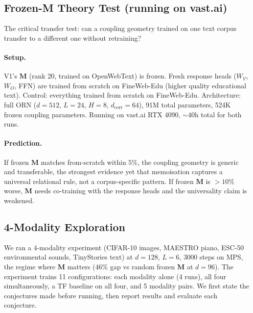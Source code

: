 \documentclass[11pt, a4paper]{article}
\newcommand{\M}{\mathbf{M}}
\theoremstyle{plain}
\theoremstyle{remark}
\begin{document}
\subsection{Frozen-M Theory Test (running on vast.ai)}

The critical transfer test: can a coupling geometry trained on one text corpus transfer to a different one without retraining?

\paragraph{Setup.}
V1's $\M$ (rank 20, trained on OpenWebText) is frozen.
Fresh response heads ($W_V$, $W_O$, FFN) are trained from scratch on FineWeb-Edu (higher quality educational text).
Control: everything trained from scratch on FineWeb-Edu.
Architecture: full ORN ($d{=}512$, $L{=}24$, $H{=}8$, $d_{\text{corr}}{=}64$), 91M total parameters, 524K frozen coupling parameters.
Running on vast.ai RTX 4090, ${\sim}40$h total for both runs.

\paragraph{Prediction.}
If frozen $\M$ matches from-scratch within $5\%$, the coupling geometry is generic and transferable, the strongest evidence yet that memoisation captures a universal relational rule, not a corpus-specific pattern.
If frozen $\M$ is $> 10\%$ worse, $\M$ needs co-training with the response heads and the universality claim is weakened.

\subsection{4-Modality Exploration}

We ran a 4-modality experiment (CIFAR-10 images, MAESTRO piano, ESC-50 environmental sounds, TinyStories text) at $d{=}128$, $L{=}6$, 3000 steps on MPS, the regime where $\M$ matters (46\% gap vs random frozen $\M$ at $d{=}96$).
The experiment trains 11 configurations: each modality alone (4 runs), all four simultaneously, a TF baseline on all four, and 5 modality pairs.
We first state the conjectures made before running, then report results and evaluate each conjecture.
\end{document}
